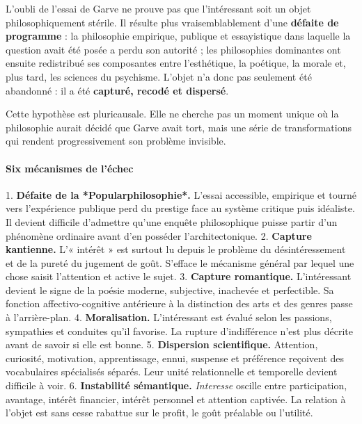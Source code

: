 \documentclass[10pt,a4paper]{article}
\begin{document}
L'oubli de l'essai de Garve ne prouve pas que l'intéressant soit un objet philosophiquement stérile. Il résulte plus vraisemblablement d'une \textbf{défaite de programme} : la philosophie empirique, publique et essayistique dans laquelle la question avait été posée a perdu son autorité ; les philosophies dominantes ont ensuite redistribué ses composantes entre l'esthétique, la poétique, la morale et, plus tard, les sciences du psychisme. L'objet n'a donc pas seulement été abandonné : il a été \textbf{capturé, recodé et dispersé}.

Cette hypothèse est pluricausale. Elle ne cherche pas un moment unique où la philosophie aurait décidé que Garve avait tort, mais une série de transformations qui rendent progressivement son problème invisible.

\paragraph{Six mécanismes de l'échec}
1. \textbf{Défaite de la *Popularphilosophie*.} L'essai accessible, empirique et tourné    vers l'expérience publique perd du prestige face au système critique puis    idéaliste. Il devient difficile d'admettre qu'une enquête philosophique puisse    partir d'un phénomène ordinaire avant d'en posséder l'architectonique. 2. \textbf{Capture kantienne.} L'« intérêt » est surtout lu depuis le problème du    désintéressement et de la pureté du jugement de goût. S'efface le mécanisme    général par lequel une chose saisit l'attention et active le sujet. 3. \textbf{Capture romantique.} L'intéressant devient le signe de la poésie moderne,    subjective, inachevée et perfectible. Sa fonction affectivo-cognitive antérieure    à la distinction des arts et des genres passe à l'arrière-plan. 4. \textbf{Moralisation.} L'intéressant est évalué selon les passions, sympathies et    conduites qu'il favorise. La rupture d'indifférence n'est plus décrite avant de    savoir si elle est bonne. 5. \textbf{Dispersion scientifique.} Attention, curiosité, motivation, apprentissage,    ennui, suspense et préférence reçoivent des vocabulaires spécialisés séparés.    Leur unité relationnelle et temporelle devient difficile à voir. 6. \textbf{Instabilité sémantique.} \emph{Interesse} oscille entre participation, avantage,    intérêt financier, intérêt personnel et attention captivée. La relation à    l'objet est sans cesse rabattue sur le profit, le goût préalable ou l'utilité.
\end{document}
